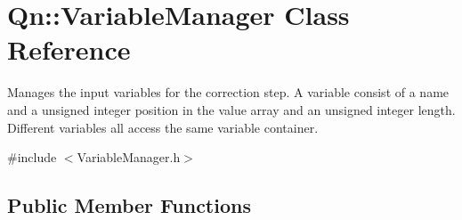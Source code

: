 \hypertarget{classQn_1_1VariableManager}{}\section{Qn\+:\+:Variable\+Manager Class Reference}
\label{classQn_1_1VariableManager}


Manages the input variables for the correction step. A variable consist of a name and a unsigned integer position in the value array and an unsigned integer length. Different variables all access the same variable container.  




{\ttfamily \#include $<$Variable\+Manager.\+h$>$}

\subsection*{Public Member Functions}
